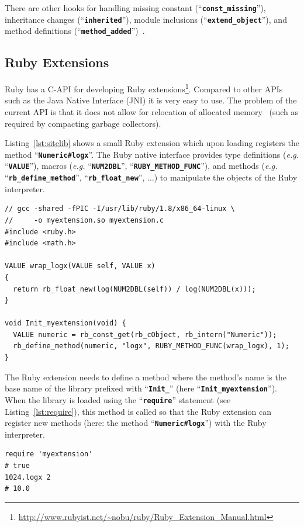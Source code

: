 \documentclass[12pt,a4paper,oneside,openright]{book}
\newcommand{\eg}{\emph{e.g.} }
\newcommand{\lst}[1]{Listing~\ref{lst:#1}}
\newcommand{\code}[1]{``\texttt{\textbf{\textcolor{codegray}{\small{#1}}}}''}
\begin{document}
\begin{CJK}{UTF8}{}
There are other hooks for handling missing constant (\code{const\_missing}), inheritance changes (\code{inherited}), module inclusions (\code{extend\_object}), and method definitions (\code{method\_added})~\citep{RefWorks:541}.

\subsection{Ruby Extensions}\label{cha:rubyext}
Ruby has a C-\acs{API} for developing Ruby extensions\footnote{\url{http://www.rubyist.net/~nobu/ruby/Ruby_Extension_Manual.html}}. Compared to other \acp{API} such as the Java Native Interface (JNI) it is very easy to use. The problem of the current \ac{API} is that it does not allow for relocation of allocated memory~\citep{ko2009} (such as required by compacting garbage collectors).

\lst{sitelib} shows a small Ruby extension which upon loading registers the method \code{Numeric\#logx}. The Ruby native interface provides type definitions (\eg \code{VALUE}), macros (\eg \code{NUM2DBL}, \code{RUBY\_METHOD\_FUNC}), and methods (\eg \code{rb\_define\_method}, \code{rb\_float\_new}, $\ldots$) to manipulate the objects of the Ruby interpreter.
\lstset{language=C,frame=single,numbers=left}
\begin{lstlisting}[float=htbp,caption={Example of a C-extension for Ruby},label=lst:sitelib]
// gcc -shared -fPIC -I/usr/lib/ruby/1.8/x86_64-linux \
//     -o myextension.so myextension.c
#include <ruby.h>
#include <math.h>

VALUE wrap_logx(VALUE self, VALUE x)
{
  return rb_float_new(log(NUM2DBL(self)) / log(NUM2DBL(x)));
}

void Init_myextension(void) {
  VALUE numeric = rb_const_get(rb_cObject, rb_intern("Numeric"));
  rb_define_method(numeric, "logx", RUBY_METHOD_FUNC(wrap_logx), 1);
}
\end{lstlisting}
The Ruby extension needs to define a method where the method's name is the base name of the library prefixed with \code{Init\_} (here \code{Init\_myextension}). When the library is loaded using the \code{require} statement (see \lst{require}), this method is called so that the Ruby extension can register new methods (here: the method \code{Numeric\#logx}) with the Ruby interpreter.
\lstset{language=Ruby,frame=single,numbers=none}
\begin{lstlisting}[float=htbp,caption={Using the extension defined in \lst{sitelib}},label=lst:require]
require 'myextension'
# true
1024.logx 2
# 10.0
\end{lstlisting}


\end{CJK}
\end{document}
